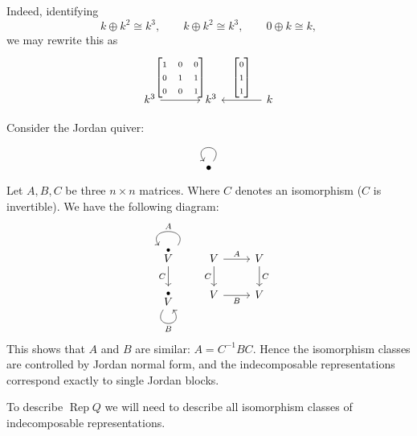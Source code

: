 \documentclass[11pt, a4paper]{report}
\begin{document}
\begin{example}
    Indeed, identifying
    \[
        k\oplus k^2 \cong k^3,\qquad
        k\oplus k^2 \cong k^3,\qquad
        0\oplus k \cong k,
    \]
    we may rewrite this as
    \[
        \begin{tikzcd}[ampersand replacement=\&,column sep=large]
            k^3 \arrow[r, "{\begin{bmatrix}
                1 & 0 & 0 \\
                0 & 1 & 1 \\
                0 & 0 & 1 \\
            \end{bmatrix}}"] \&
            k^3 \&
            k \arrow[l, "{\begin{bmatrix}
                0 \\
                1 \\
                1
            \end{bmatrix}}"']
        \end{tikzcd}
    \]
\end{example}

\begin{example}
    Consider the Jordan quiver:
    \[
        \begin{tikzcd}
            \bullet \arrow[loop, distance=2em, in=125, out=55]
        \end{tikzcd}
    \]
    Let $A,B,C$ be three $n \times n$ matrices. Where $C$ denotes an isomorphism ($C$ is invertible). We have the following diagram:
    \[
        \begin{tikzcd}
            \overset{\bullet}{V} \arrow["A"', loop, distance=2em, in=125, out=55] \arrow[d, "C"'] \\
            \overset{\bullet}{V} \arrow["B"', loop, distance=2em, in=305, out=235]
        \end{tikzcd}
        \ \ \
        \begin{tikzcd}
            V \arrow[r, "A"] \arrow[d, "C"'] & V \arrow[d, "C"] \\
            V \arrow[r, "B"']                & V
        \end{tikzcd}
    \]
    This shows that $A$ and $B$ are similar: $A = C^{-1} B C$. Hence the isomorphism classes are controlled by Jordan normal form, and the indecomposable representations correspond exactly to single Jordan blocks.
\end{example}

To describe $\operatorname{Rep}Q$ we will need to describe all isomorphism classes of indecomposable representations.
\end{document}
